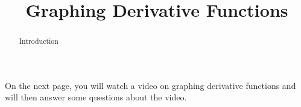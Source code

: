 \documentclass[handout]{ximera}
\title{Graphing Derivative Functions}
\begin{document}
\begin{abstract} Introduction %
\end{abstract}

\maketitle

On the next page, you will watch a video on graphing derivative functions and will then answer some questions about the video.
\end{document}
